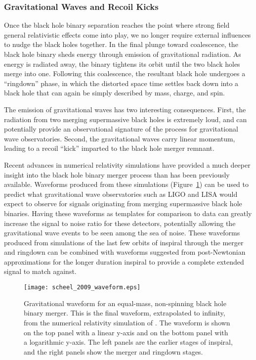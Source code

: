\subsubsection{Gravitational Waves and Recoil Kicks}

Once the black hole binary separation reaches the point where strong field general relativistic effects come into play, we no longer require external influences to nudge the black holes together.  In the final plunge toward coalescence, the black hole binary sheds energy through emission of gravitational radiation.  As energy is radiated away, the binary tightens its orbit until the two black holes merge into one.  Following this coalescence, the resultant black hole undergoes a ``ringdown'' phase, in which the distorted space time settles back down into a black hole that can again be simply described by mass, charge, and spin.

The emission of gravitational waves has two interesting consequences.  First, the radiation from two merging supermassive black holes is extremely loud, and can potentially provide an observational signature of the process for gravitational wave observatories.  Second, the gravitational waves carry linear momentum, leading to a recoil ``kick'' imparted to the black hole merger remnant.

Recent advances in numerical relativity simulations have provided a much deeper insight into the black hole binary merger process than has been previously available.  Waveforms produced from these simulations (Figure~\ref{fig:waveform}) can be used to predict what gravitational wave observatories such as LIGO and LISA would expect to observe for signals originating from merging supermassive black hole binaries.  Having these waveforms as templates for comparison to data can greatly increase the signal to noise ratio for these detectors, potentially allowing the gravitational wave events to be seen among the sea of noise.  These waveforms produced from simulations of the last few orbits of inspiral through the merger and ringdown can be combined with waveforms suggested from post-Newtonian approximations for the longer duration inspiral to provide a complete extended signal to match against.

\begin{figure}[H]
\centering
\texttt{[image: scheel\_2009\_waveform.eps]}
\caption[Gravitational waveform for a black hole binary merger]{\footnotesize Gravitational waveform for an equal-mass, non-spinning black hole binary merger. This is the final waveform, extrapolated to infinity, from the numerical relativity simulation of \citet{scheel_2009}.  The waveform is shown on the top panel with a linear y-axis and on the bottom panel with a logarithmic y-axis.  The left panels are the earlier stages of inspiral, and the right panels show the merger and ringdown stages.}
\label{fig:waveform}
\end{figure}

